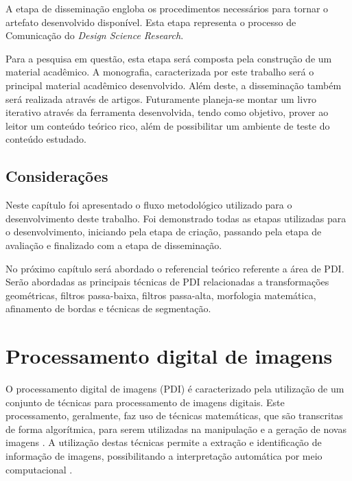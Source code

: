 \documentclass[
	12pt,				%
	oneside,			%
	a4paper,			%
	english,			%
	french,				%
	spanish,			%
	brazil,				%
	]{abntex2}
\begin{document}
A etapa de disseminação engloba os procedimentos necessários para tornar o artefato desenvolvido disponível. Esta etapa representa o processo de Comunicação do  \textit{Design Science Research}.

Para a pesquisa em questão, esta etapa será composta pela construção de um material acadêmico. A monografia, caracterizada por este trabalho será o principal material acadêmico desenvolvido. Além deste, a disseminação também será realizada através de artigos. Futuramente planeja-se montar um livro iterativo através da ferramenta desenvolvida, tendo como objetivo, prover ao leitor um conteúdo teórico rico, além de possibilitar um ambiente de teste do conteúdo estudado.

\section{Considerações}

Neste capítulo foi apresentado o fluxo metodológico utilizado para o desenvolvimento deste trabalho. Foi demonstrado todas as etapas utilizadas para o desenvolvimento, iniciando pela etapa de criação, passando pela etapa de avaliação e finalizado com a etapa de disseminação. 

No próximo capítulo será abordado o referencial teórico referente a área de PDI. Serão abordadas as principais técnicas de PDI relacionadas a transformações geométricas, filtros passa-baixa, filtros passa-alta, morfologia matemática, afinamento de bordas e técnicas de segmentação.

\chapter{Processamento digital de imagens}
\label{sec:pdi}

O  processamento digital de imagens (PDI) é caracterizado pela utilização de um conjunto de técnicas para processamento de imagens digitais. Este processamento, geralmente, faz uso de técnicas matemáticas, que são transcritas de forma algorítmica, para serem utilizadas na manipulação e a geração de novas imagens \cite{gonzalesWoods:2008}. A utilização destas técnicas permite a extração e identificação de informação de imagens, possibilitando a interpretação automática por meio computacional \cite{pedriniSchwartz:2008}.
\end{document}
